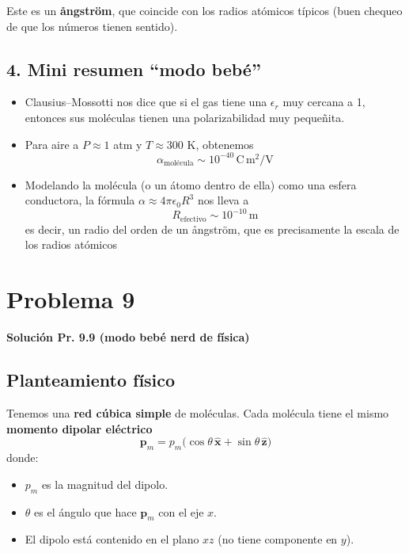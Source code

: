 \documentclass{article}
\begin{document}
Este es un \textbf{ångström}, que coincide con los radios atómicos típicos (buen chequeo de que los números tienen sentido).

\subsection*{4. Mini resumen “modo bebé”}

\begin{itemize}
  \item Clausius–Mossotti nos dice que si el gas tiene una $\epsilon_{r}$ muy cercana a 1, entonces sus moléculas tienen una polarizabilidad muy pequeñita.
  \item Para aire a $P\approx 1$ atm y $T\approx 300$ K, obtenemos
    \[
    \alpha_{\text{molécula}} \sim 10^{-40}\,\text{C}\,\text{m}^{2}/\text{V}
    \]
  \item Modelando la molécula (o un átomo dentro de ella) como una esfera conductora, la fórmula $\alpha \approx 4\pi\epsilon_{0}R^{3}$ nos lleva a
    \[
    R_{\text{efectivo}} \sim 10^{-10}\,\text{m}
    \]
    es decir, un radio del orden de un ångström, que es precisamente la escala de los radios atómicos
\end{itemize}


\section{Problema 9}

\textcolor{Cinnabar}{\textbf{Solución Pr. 9.9 (modo bebé nerd de física)}} \vspace{0.4cm}

\subsection*{Planteamiento físico}

Tenemos una \textbf{red cúbica simple} de moléculas.  
Cada molécula tiene el mismo \textbf{momento dipolar eléctrico}
\begin{equation}
\mathbf{p}_{m} = p_{m}\bigl(\cos\theta\,\hat{\mathbf{x}} + \sin\theta\,\hat{\mathbf{z}}\bigr)
\label{eq:pm-def}
\end{equation}
donde:
\begin{itemize}
  \item $p_{m}$ es la magnitud del dipolo.
  \item $\theta$ es el ángulo que hace $\mathbf{p}_{m}$ con el eje $x$.
  \item El dipolo está contenido en el plano $xz$ (no tiene componente en $y$).
\end{itemize}
\end{document}
